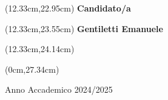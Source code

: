 \begin{textblock*}{8cm}(12.33cm,22.95cm)
	\noindent
	\textbf{Candidato/a}
\end{textblock*}
\begin{textblock*}{8cm}(12.33cm,23.55cm)
	\noindent	\textbf{Gentiletti Emanuele}
\end{textblock*}
\begin{textblock*}{8cm}(12.33cm,24.14cm)
\end{textblock*}

\begin{textblock*}{21cm}(0cm,27.34cm)
	\centerline{Anno Accademico 2024/2025}
\end{textblock*}

\endgroup

\newpage
$ $

\newpage
$ $

